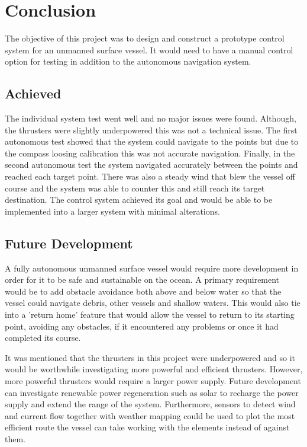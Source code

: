 \chapter{Conclusion}
The objective of this project was to design and construct a prototype control system for an unmanned surface vessel. It would need to have a manual control option for testing in addition to the autonomous navigation system.
\section{Achieved}
The individual system test went well and no major issues were found. Although, the thrusters were slightly underpowered this was not a technical issue. The first autonomous test showed that the system could navigate to the points but due to the compass loosing calibration this was not accurate navigation. Finally, in the second autonomous test the system navigated accurately between the points and reached each target point. There was also a steady wind that blew the vessel off course and the system was able to counter this and still reach its target destination. The control system achieved its goal and would be able to be implemented into a larger system with minimal alterations. 
\section{Future Development}
A fully autonomous unmanned surface vessel would require more development in order for it to be safe and sustainable on the ocean. A primary requirement would be to add obstacle avoidance both above and below water so that the vessel could navigate debris, other vessels and shallow waters. This would also tie into a 'return home' feature that would allow the vessel to return to its starting point, avoiding any obstacles, if it encountered any problems or once it had completed its course. \par
It was mentioned that the thrusters in this project were underpowered and so it would be worthwhile investigating more powerful and efficient thrusters. However, more powerful thrusters would require a larger power supply. Future development can investigate renewable power regeneration such as solar to recharge the power supply and extend the range of the system. Furthermore, sensors to detect wind and current flow together with weather mapping could be used to plot the most efficient route the vessel can take working with the elements instead of against them. 